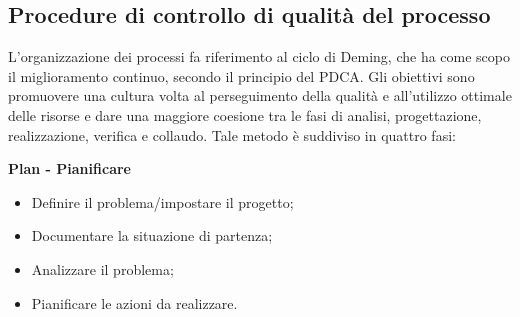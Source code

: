 {    \subsection{Procedure di controllo di qualità del processo}{
	L’organizzazione dei processi fa riferimento al ciclo di Deming, che ha come
	scopo il miglioramento continuo, secondo il principio del PDCA. Gli obiettivi
	sono promuovere una cultura volta al perseguimento della qualità e all’utilizzo
	ottimale delle risorse e dare una maggiore coesione tra le fasi di analisi,
	progettazione, realizzazione, verifica e collaudo. Tale metodo è suddiviso in
	quattro fasi:
	\begin{itemize}{
		\item[1.] \textbf{Plan - Pianificare}
			\begin{itemize}
			\item[(a)] Definire il problema/impostare il progetto;
			\item[(b)] Documentare la situazione di partenza;
			\item[(c)] Analizzare il problema;
			\item[(d)] Pianificare le azioni da realizzare.
			\end{itemize}
			
}
\end{itemize}}}
